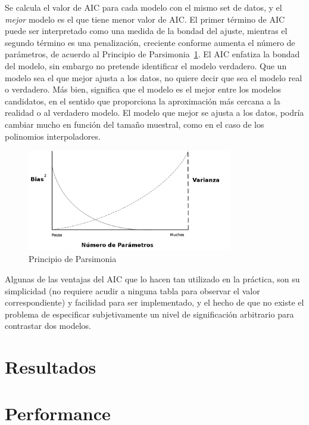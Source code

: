 Se calcula el valor de AIC para cada modelo con el mismo set de datos, y
el \emph{mejor} modelo es el que tiene menor valor de AIC.
El primer término de AIC puede ser interpretado como una medida de la bondad
del ajuste, mientras el segundo término es una penalización, creciente conforme
aumenta el número de parámetros, de acuerdo al Principio de
Parsimonia~\ref{fig:parsimony}. El AIC enfatiza la bondad del modelo, sin
embargo no pretende identificar el modelo verdadero. Que un modelo sea el que
mejor ajusta a los datos, no quiere decir que sea el modelo real o verdadero.
Más bien, significa que el modelo es el mejor entre los modelos candidatos, en
el sentido que proporciona la aproximación más cercana a la realidad o al
verdadero modelo. El modelo que mejor se ajusta a los datos, podría cambiar
mucho en función del tamaño muestral, como en el caso de los polinomios
interpoladores. 

\begin{figure}[h!t]
    \begin{center}
        \includegraphics[width=0.8\textwidth]{images/parsimony}
        \caption{Principio de Parsimonia}
        \label{fig:parsimony}
    \end{center}
\end{figure}

Algunas de las ventajas del AIC que lo hacen tan utilizado en la práctica, son
su simplicidad (no requiere acudir a ninguna tabla para observar el valor
correspondiente) y facilidad para ser implementado, y el hecho de que no existe
el problema de especificar subjetivamente un nivel de significación arbitrario
para contrastar dos modelos.


\section{Resultados}

\section{Performance}


